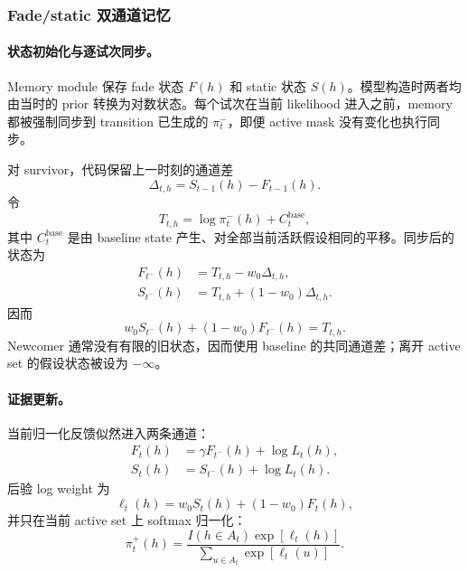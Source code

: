 \subsubsection{Fade/static 双通道记忆}

\paragraph{状态初始化与逐试次同步。}
Memory module 保存 fade 状态 $F(h)$ 和 static 状态 $S(h)$。模型构造时两者均由当时的 prior 转换为对数状态。每个试次在当前 likelihood 进入之前，memory 都被强制同步到 transition 已生成的 $\pi_t^-$，即便 active mask 没有变化也执行同步。

对 survivor，代码保留上一时刻的通道差
\begin{equation}
    \Delta_{t,h}
    =
    S_{t-1}(h)-F_{t-1}(h).
    \label{eq:modelv14-memory-offset}
\end{equation}
令
\begin{equation}
    T_{t,h}
    =
    \log\pi_t^-(h)+C_t^{\mathrm{base}},
    \label{eq:modelv14-memory-target}
\end{equation}
其中 $C_t^{\mathrm{base}}$ 是由 baseline state 产生、对全部当前活跃假设相同的平移。同步后的状态为
\begin{align}
    F_{t^-}(h)
    &=
    T_{t,h}-w_0\Delta_{t,h},\\
    S_{t^-}(h)
    &=
    T_{t,h}+(1-w_0)\Delta_{t,h}.
    \label{eq:modelv14-memory-sync}
\end{align}
因而
\[
    w_0S_{t^-}(h)+(1-w_0)F_{t^-}(h)=T_{t,h}.
\]
Newcomer 通常没有有限的旧状态，因而使用 baseline 的共同通道差；离开 active set 的假设状态被设为 $-\infty$。

\paragraph{证据更新。}
当前归一化反馈似然进入两条通道：
\begin{align}
    F_t(h)
    &=
    \gamma F_{t^-}(h)+\log L_t(h),\\
    S_t(h)
    &=
    S_{t^-}(h)+\log L_t(h).
    \label{eq:modelv14-memory-update}
\end{align}
后验 log weight 为
\begin{equation}
    \ell_t(h)
    =
    w_0S_t(h)+(1-w_0)F_t(h),
    \label{eq:modelv14-memory-mixture}
\end{equation}
并只在当前 active set 上 softmax 归一化：
\begin{equation}
    \pi_t^+(h)
    =
    \frac{
        I(h\in A_t)\exp[\ell_t(h)]
    }{
        \sum_{u\in A_t}\exp[\ell_t(u)]
    }.
    \label{eq:modelv14-memory-posterior}
\end{equation}

